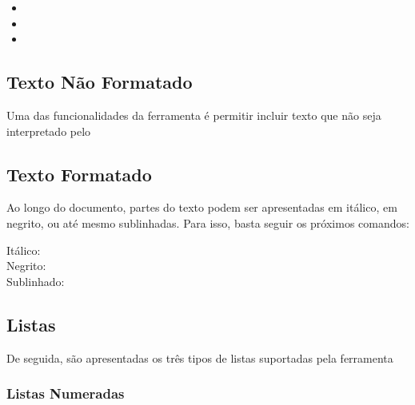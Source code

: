 \documentclass[11pt,a4paper]{article}
\begin{document}
\begin{itemize}
    \item \verb@ %t1{Título da secção} @
    \item \verb@ %t2{Título da subsecção} @
    \item \verb@ %t3{Título de subsubsecção} @
\end{itemize}

\verb@ %t2{Título de subsubsecção} @

 
\subsection{Texto Não Formatado}
Uma das funcionalidades da ferramenta é permitir incluir texto que não seja interpretado pelo %


\subsection{Texto Formatado}
Ao longo do documento, partes do texto podem ser apresentadas em itálico, em negrito, ou até mesmo sublinhadas. Para isso, basta seguir os próximos comandos:

\begin{description}
    \item[Itálico:] %
    \item[Negrito:] %
    \item[Sublinhado:] %
\end{description}


\subsection{Listas} 
De seguida, são apresentadas os três tipos de listas suportadas pela ferramenta %
 

\subsubsection{Listas Numeradas}
\end{document}
